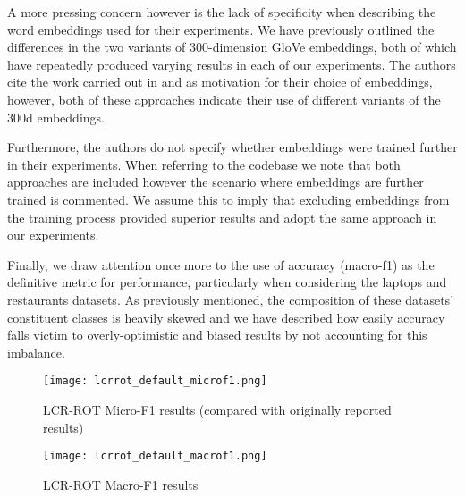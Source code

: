 \documentclass[../../fyp.tex]{subfiles}
\begin{document}
A more pressing concern however is the lack of specificity when describing the word embeddings used for their experiments. We have previously outlined the differences in the two variants of 300-dimension GloVe embeddings, both of which have repeatedly produced varying results in each of our experiments. The authors cite the work carried out in \cite{wang2018} and \cite{tang2016} as motivation for their choice of embeddings, however, both of these approaches indicate their use of different variants of the 300d embeddings.

Furthermore, the authors do not specify whether embeddings were trained further in their experiments. When referring to the codebase we note that both approaches are included however the scenario where embeddings are further trained is commented. We assume this to imply that excluding embeddings from the training process provided superior results and adopt the same approach in our experiments. 

Finally, we draw attention once more to the use of accuracy (macro-f1) as the definitive metric for performance, particularly when considering the laptops and restaurants datasets. As previously mentioned, the composition of these datasets' constituent classes is heavily skewed and we have described how easily accuracy falls victim to overly-optimistic and biased results by not accounting for this imbalance.   

\begin{figure}[!ht]
	\centering
	\texttt{[image: lcrrot\_default\_microf1.png]}
	\caption{LCR-ROT Micro-F1 results (compared with originally reported results)}
	\label{fig:ffnn}
\end{figure}

\begin{figure}[!ht]
	\centering
	\texttt{[image: lcrrot\_default\_macrof1.png]}
	\caption{LCR-ROT Macro-F1 results}
	\label{fig:ffnn}
\end{figure}
\end{document}
